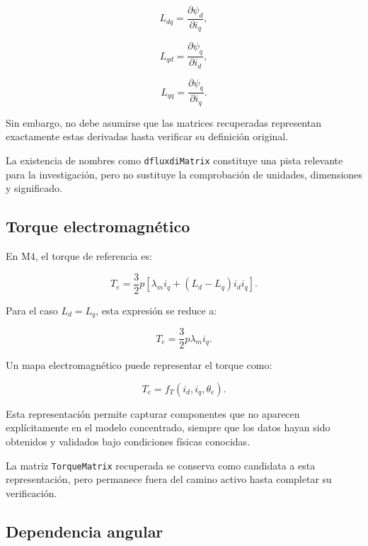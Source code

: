 \begin{equation}
L_{dq}=
\frac{\partial\psi_d}{\partial i_q},
\end{equation}

\begin{equation}
L_{qd}=
\frac{\partial\psi_q}{\partial i_d},
\end{equation}

\begin{equation}
L_{qq}=
\frac{\partial\psi_q}{\partial i_q}.
\end{equation}

Sin embargo, no debe asumirse que las matrices recuperadas representan exactamente estas derivadas hasta verificar su definición original.

La existencia de nombres como \texttt{dfluxdiMatrix} constituye una pista relevante para la investigación, pero no sustituye la comprobación de unidades, dimensiones y significado.

\subsection{Torque electromagnético}

En M4, el torque de referencia es:

\begin{equation}
T_e=
\frac{3}{2}p
\left[
\lambda_m i_q+
(L_d-L_q)i_di_q
\right].
\end{equation}

Para el caso $L_d=L_q$, esta expresión se reduce a:

\begin{equation}
T_e=
\frac{3}{2}p\lambda_m i_q.
\end{equation}

Un mapa electromagnético puede representar el torque como:

\begin{equation}
T_e=f_T(i_d,i_q,\theta_e).
\end{equation}

Esta representación permite capturar componentes que no aparecen explícitamente en el modelo concentrado, siempre que los datos hayan sido obtenidos y validados bajo condiciones físicas conocidas.

La matriz \texttt{TorqueMatrix} recuperada se conserva como candidata a esta representación, pero permanece fuera del camino activo hasta completar su verificación.

\subsection{Dependencia angular}

